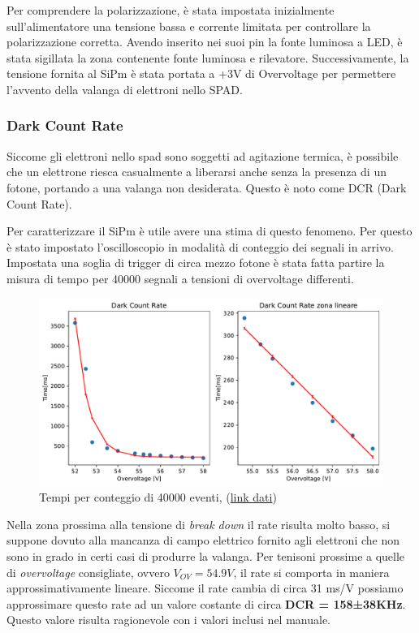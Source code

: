 Per comprendere la polarizzazione, è stata impostata inizialmente sull'alimentatore una tensione bassa e corrente limitata per controllare la polarizzazione corretta. Avendo inserito nei suoi pin la fonte luminosa a LED, è stata sigillata la zona contenente fonte luminosa e rilevatore. Successivamente, la tensione fornita al SiPm è stata portata a +3V di Overvoltage per permettere l'avvento della valanga di elettroni nello SPAD.

\subsubsection{Dark Count Rate}
Siccome gli elettroni nello spad sono soggetti ad agitazione termica, è possibile che un elettrone riesca casualmente a liberarsi anche senza la presenza di un fotone, portando a una valanga non desiderata. Questo è noto come DCR (Dark Count Rate).

Per caratterizzare il SiPm è utile avere una stima di questo fenomeno. Per questo è stato impostato l'oscilloscopio in modalità di conteggio dei segnali in arrivo. Impostata una soglia di trigger di circa mezzo fotone è stata fatta partire la misura di tempo per 40000 segnali a tensioni di overvoltage differenti.

\begin{figure}[!h]
    \centering
    \includegraphics[width=0.6\linewidth]{Photomultiplier/assets/SiPm/SiPm_DCR.pdf}
    \caption{Tempi per conteggio di 40000 eventi, (\href{https://github.com/Yedi278/Esperimentazioni-Elettronica/tree/main/SiPm/Caratterizzazione\%20Hamamatsu}{link dati})}
\end{figure}

Nella zona prossima alla tensione di \textit{break down} il rate risulta molto basso, si suppone dovuto alla mancanza di campo elettrico fornito agli elettroni che non sono in grado in certi casi di produrre la valanga. Per tenisoni prossime a quelle di \textit{overvoltage} consigliate, ovvero $V_{OV} = 54.9V$, il rate si comporta in maniera approssimativamente lineare. Siccome il rate cambia di circa 31 ms/V possiamo approssimare questo rate ad un valore costante di circa \textbf{DCR = 158±38KHz}.
Questo valore risulta ragionevole con i valori inclusi nel manuale.